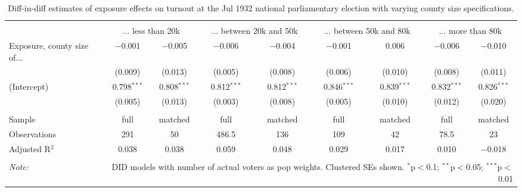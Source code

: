 
\begin{table}[!htbp] \centering 
  \caption{Diff-in-diff estimates of exposure effects on turnout at the Jul 1932 national parliamentary election with varying county size specifications.\vspace{-.25cm}} 
  \label{tab:turnout-countysize-dd-1932-1} 
\scriptsize 
\begin{tabular}{@{\extracolsep{5pt}}lcccccccc} 
\\[-1.8ex]\hline 
\hline \\[-1.8ex] 
 & \multicolumn{2}{c}{... less than 20k } & \multicolumn{2}{c}{... between 20k and 50k} & \multicolumn{2}{c}{... between 50k and 80k} & \multicolumn{2}{c}{... more than 80k} \\ 
 \cmidrule(r){2-3}\cmidrule(r){4-5}\cmidrule(r){6-7}\cmidrule(r){8-9}Exposure, county size of... & $-$0.001 & $-$0.005 & $-$0.006 & $-$0.004 & $-$0.001 & 0.006 & $-$0.006 & $-$0.010 \\ 
  & (0.009) & (0.013) & (0.005) & (0.008) & (0.006) & (0.010) & (0.008) & (0.011) \\ 
  (Intercept) & 0.798$^{***}$ & 0.808$^{***}$ & 0.812$^{***}$ & 0.812$^{***}$ & 0.846$^{***}$ & 0.839$^{***}$ & 0.832$^{***}$ & 0.826$^{***}$ \\ 
  & (0.005) & (0.013) & (0.003) & (0.008) & (0.005) & (0.010) & (0.012) & (0.020) \\ 
 \hline \\[-1.8ex] 
Sample & full & matched & full & matched & full & matched & full & matched \\ 
Observations & 291 & 50 & 486.5 & 136 & 109 & 42 & 78.5 & 23 \\ 
Adjusted R$^{2}$ & 0.038 & 0.038 & 0.059 & 0.048 & 0.029 & 0.017 & 0.010 & $-$0.018 \\ 
\hline 
\hline \\[-1.8ex] 
\textit{Note:}  & \multicolumn{8}{r}{DID models with number of actual voters as pop weights. Clustered SEs shown. $^{*}$p$<$0.1; $^{**}$p$<$0.05; $^{***}$p$<$0.01} \\ 
\end{tabular} 
\end{table} 

